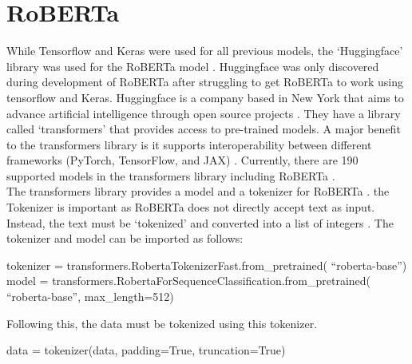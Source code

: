 \section{RoBERTa}
While Tensorflow and Keras were used for all previous models, the `Huggingface' library was used for the RoBERTa model \cite{huggingface}. Huggingface was only discovered
during development of RoBERTa after struggling to get RoBERTa to work using tensorflow and Keras. Huggingface is a company based in New York that aims
to advance artificial intelligence through open source projects \cite{huggingface}. They have a library called `transformers' \cite{transformers} that provides access
to pre-trained models. A major benefit to the transformers library is it supports interoperability between different frameworks (PyTorch, TensorFlow, and JAX)
\cite{transformers}. Currently, there are 190 supported models in the transformers library including RoBERTa \cite{transformers}.\\
The transformers library provides a model and a tokenizer for RoBERTa \cite{hug-rob}. the Tokenizer is important as RoBERTa does not directly accept text as input. Instead,
the text must be `tokenized' and converted into a list of integers \cite{tokenizer-important}. The tokenizer and model can be imported as follows:
\begin{algorithm}
    \begin{algorithmic}
        \STATE tokenizer = transformers.RobertaTokenizerFast.from\_pretrained(
        \bindent
        \STATE ``roberta-base'')
        \eindent
        \STATE model = transformers.RobertaForSequenceClassification.from\_pretrained(
        \bindent
        \STATE    ``roberta-base'', max\_length=512)
        \eindent
    \end{algorithmic}
\end{algorithm}

Following this, the data must be tokenized using this tokenizer.
\begin{algorithm}
    \begin{algorithmic}
        \STATE data = tokenizer(data, padding=True, truncation=True)
    \end{algorithmic}
\end{algorithm}

